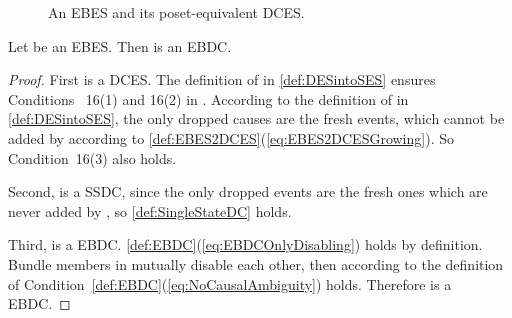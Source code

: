 \documentclass[runningheads,a4paper]{llncs}
\begin{document}
\begin{figure}[tb]
	\centering
	\caption{An EBES and its poset-equivalent DCES.}
	\label{fig:exampleEBES2DCES}
\end{figure}

\begin{lemma}
\label{lma:EmdeddingIsEBDC}
Let  be an EBES. Then  is an EBDC.
\end{lemma}

\begin{proof}
First  is a DCES. The definition of  in \ref{def:DESintoSES} ensures Conditions~
16(1) and
16(2) in \cite{dynamicCausality15}. According to the definition of
 in \ref{def:DESintoSES}, the only dropped causes are the
fresh events, which cannot be added by  according to
\ref{def:EBES2DCES}(\ref{eq:EBES2DCESGrowing}). So Condition~16(3) also holds.

Second,  is a SSDC, since the only dropped events are the
fresh ones which are never added by , so \ref{def:SingleStateDC} holds.

Third,
 is a EBDC. \ref{def:EBDC}(\ref{eq:EBDCOnlyDisabling})
holds by definition. 
Bundle members in  mutually disable each other, then according to
the definition of  Condition~\ref{def:EBDC}(\ref{eq:NoCausalAmbiguity})
holds. Therefore  is a EBDC.
\end{proof}
\end{document}
